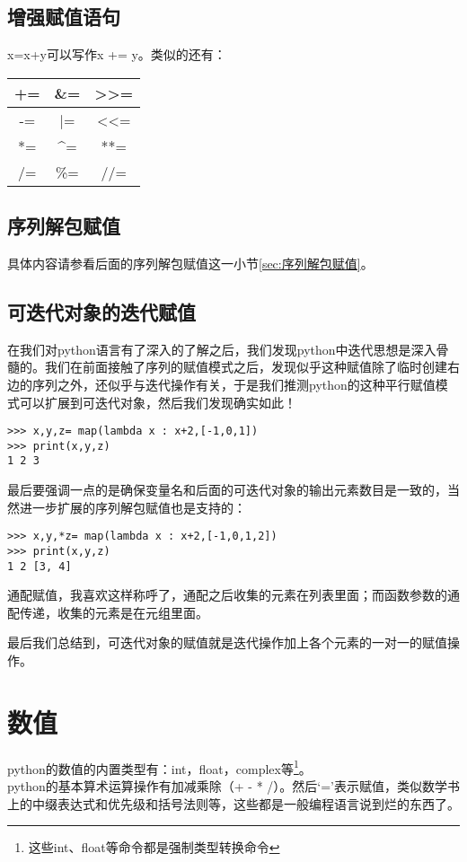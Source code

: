 \documentclass[12pt,oneside]{book}
\begin{document}
\begin{common-format}
\subsection{增强赋值语句}
x=x+y可以写作x += y。类似的还有：
\begin{tabular}{|c|c|c|}
\hline 
+= & \&{}= & >>= \\ 
\hline 
-= & |= & <<= \\ 
\hline 
*= & \^{}= & **= \\ 
\hline 
/= & \%{}= & //= \\ 
\hline 
\end{tabular} 

\subsection{序列解包赋值}
具体内容请参看后面的序列解包赋值这一小节\ref{sec:序列解包赋值}。

\subsection{可迭代对象的迭代赋值}
在我们对python语言有了深入的了解之后，我们发现python中迭代思想是深入骨髓的。我们在前面接触了序列的赋值模式之后，发现似乎这种赋值除了临时创建右边的序列之外，还似乎与迭代操作有关，于是我们推测python的这种平行赋值模式可以扩展到可迭代对象，然后我们发现确实如此！
\begin{Verbatim}
>>> x,y,z= map(lambda x : x+2,[-1,0,1])
>>> print(x,y,z)
1 2 3
\end{Verbatim}

最后要强调一点的是确保变量名和后面的可迭代对象的输出元素数目是一致的，当然进一步扩展的序列解包赋值也是支持的：
\begin{Verbatim}
>>> x,y,*z= map(lambda x : x+2,[-1,0,1,2])
>>> print(x,y,z)
1 2 [3, 4]
\end{Verbatim}
通配赋值，我喜欢这样称呼了，通配之后收集的元素在列表里面；而函数参数的通配传递，收集的元素是在元组里面。

最后我们总结到，可迭代对象的赋值就是迭代操作加上各个元素的一对一的赋值操作。


\section{数值}
python的数值的内置类型有：int，float，complex等\footnote{这些int、float等命令都是强制类型转换命令}。\\python的基本算术运算操作有加减乘除（+ - * /）。然后‘=’表示赋值，类似数学书上的中缀表达式和优先级和括号法则等，这些都是一般编程语言说到烂的东西了。


\end{common-format}
\end{document}
